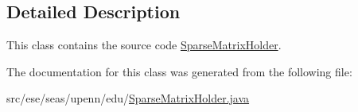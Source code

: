\subsection{Detailed Description}
This class contains the source code \hyperlink{classese_1_1seas_1_1upenn_1_1edu_1_1_sparse_matrix_holder}{Sparse\+Matrix\+Holder}. 

The documentation for this class was generated from the following file\+:\begin{DoxyCompactItemize}
\item 
src/ese/seas/upenn/edu/\hyperlink{_sparse_matrix_holder_8java}{Sparse\+Matrix\+Holder.\+java}\end{DoxyCompactItemize}
